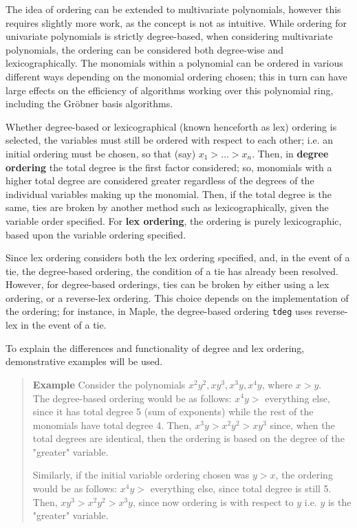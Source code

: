 \documentclass[letterpaper,12pt,titlepage,oneside,final]{book}
\newenvironment{example}{\begin{quote}%
  \textbf{Example }%
  \quad
}{%
\end{quote}%
}
\begin{document}
The idea of ordering can be extended to multivariate polynomials, however this requires slightly more work, as the concept is not as intuitive.  While ordering for univariate polynomials is strictly degree-based, when considering multivariate polynomials, the ordering can be considered both degree-wise and lexicographically.  The monomials within a polynomial can be ordered in various different ways depending on the monomial ordering chosen; this in turn can have large effects on the efficiency of algorithms working over this polynomial ring, including the Gr\"obner basis algorithms.

Whether degree-based or lexicographical (known henceforth as lex) ordering is selected, the variables must still be ordered with respect to each other; i.e. an initial ordering must be chosen, so that (say) ${x_1 > \ldots > x_n}$.  Then, in \textbf{degree ordering} the total degree is the first factor considered; so, monomials with a higher total degree are considered greater regardless of the degrees of the individual variables making up the monomial.  Then, if the total degree is the same, ties are broken by another method such as lexicographically, given the variable order specified.  For \textbf{lex ordering}, the ordering is purely lexicographic, based upon the variable ordering specified.

Since lex ordering considers both the lex ordering specified, and, in the event of a tie, the degree-based ordering, the condition of a tie has already been resolved.  However, for degree-based orderings, ties can be broken by either using a lex ordering, or a reverse-lex ordering.  This choice depends on the implementation of the ordering; for instance, in Maple, the degree-based ordering \texttt{tdeg} uses reverse-lex in the event of a tie.

To explain the differences and functionality of degree and lex ordering, demonstrative examples will be used.  

\begin{example}\label{ex: Multivariate degree ordering}
  Consider the polynomials ${x^2y^2, xy^3, x^3y, x^4y}$, where ${x > y}$.\\
  The degree-based ordering would be as follows:
  ${x^4y >}$ everything else, since it has total degree 5 (sum of exponents) while the rest of the monomials have total degree 4.  Then, ${x^3y > x^2y^2 > xy^3}$ since, when the total degrees are identical, then the ordering is based on the degree of the "greater" variable.

  Similarly, if the initial variable ordering chosen was ${y > x}$, the ordering would be as follows:
  ${x^4y >}$ everything else, since total degree is still 5.  Then, ${xy^3 > x^2y^2 > x^3y}$, since now ordering is with respect to ${y}$ i.e. ${y}$ is the "greater" variable.
\end{example}
\end{document}
